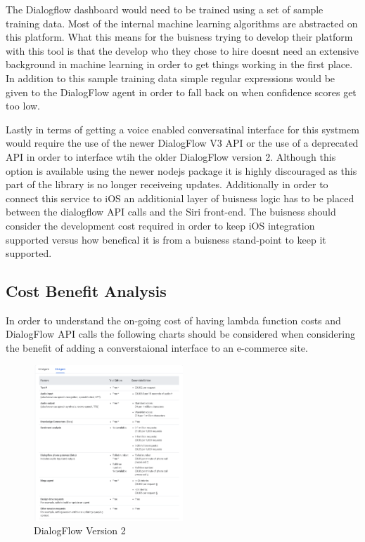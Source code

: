 \documentclass[9pt,software]{livecoms}
\begin{document}
The Dialogflow dashboard would need to be trained using a set of sample training data. Most of the internal machine learning algorithms are abstracted on this platform. 
What this means for the buisness trying to develop their platform with this tool is that the develop who they chose to hire doesnt need an extensive background in machine
learning in order to get things working in the first place. In addition to this sample training data simple regular expressions would be given to the DialogFlow agent in order
to fall back on when confidence scores get too low. 

Lastly in terms of getting a voice enabled conversatinal interface for this systmem would require the use of the newer DialogFlow V3 API or the use of a deprecated 
API in order to interface wtih the older DialogFlow version 2. Although this option is available using the newer nodejs package it is highly discouraged as this part
of the library is no longer receiveing updates. Additionally in order to connect this service to iOS an additionial layer of buisness logic has to be placed between the 
dialogflow API calls and the Siri front-end. The buisness should consider the development cost required in order to keep iOS integration supported versus how 
benefical it is from a buisness stand-point to keep it supported. 

\subsection{Cost Benefit Analysis}
In order to understand the on-going cost of having lambda function costs and DialogFlow API calls the following charts should be considered when 
considering the benefit of adding a converstaional interface to an e-commerce site. 

\begin{figure}
  \caption{DialogFlow Version 2}
  \centering
    \includegraphics[width=0.5\textwidth]{ESAgent.PNG}
\end{figure}
\end{document}
